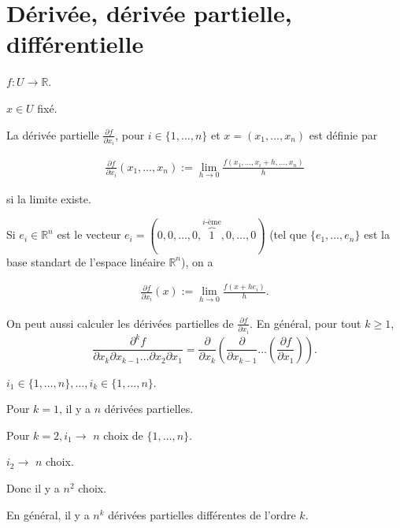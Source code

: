 \documentclass[french]{article}
\begin{document}
\section{Dérivée, dérivée partielle, différentielle}

$ f : U \to \mathbb{R}$.

$x \in U$ fixé.

La dérivée partielle $\frac{\partial f }{\partial x_i} $, pour $ i \in \{ 1, \dots, n \} $ et $x = (x_1, \dots, x_n)$ est définie par

\begin{gather*}
  \frac{\partial f }{\partial x_i} (x_1, \dots, x_n) := \lim_{h \to 0} \frac{f(x_1, \dots, x_i + h, \dots, x_n)}{h}
\end{gather*}

si la limite existe.

Si $e_i \in \mathbb{R}^n$ est le vecteur $e_i = (0,0,  \dots, 0, \overbrace{1}^{i\text{-ème}}, 0, \dots, 0)$ (tel que $\{ e_1, \dots, e_n \} $ est la base standart de l'espace linéaire $\mathbb{R}^n$), on a

\begin{gather*}
  \frac{\partial f }{\partial x_i }(x) := \lim_{h \to 0} \frac{f(x+h e_i)}{h}  .
\end{gather*}

On peut aussi calculer les dérivées partielles de $\frac{\partial f }{\partial x_i} $. En général, pour tout $k \geq 1$, $$ \frac{\partial ^{k} f }{\partial x_k \partial x _{k-1} \dots \partial x_2 \partial x_1 }  = \frac{\partial  }{\partial x_k } \left(\frac{\partial  }{\partial x _{k-1} } \dots \left(\frac{\partial f }{\partial x_1} \right) \right) .$$

$i_1 \in \{ 1, \dots, n \}, \dots, i_k \in \{ 1, \dots, n \} $.

Pour $k=1$, il y a $n$ dérivées partielles.

Pour $k=2, i_1 \longrightarrow$ $n$ choix de $\{ 1, \dots, n \} $.

$i_2 \longrightarrow $ $n$ choix.

Donc il y a $n ^2$ choix.

En général, il y a $n ^{k}$ dérivées partielles différentes de l'ordre $k$.
\end{document}
